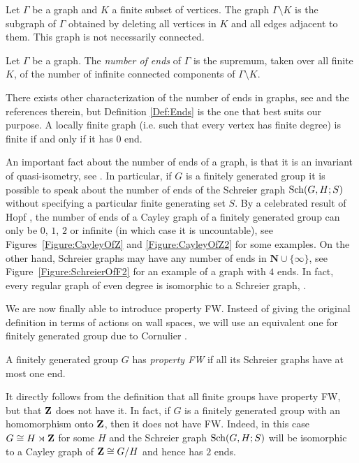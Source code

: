 Let $\Gamma$ be a graph and $K$ a finite subset of vertices. The graph $\Gamma\setminus K$ is the subgraph of $\Gamma$ obtained by deleting all vertices in $K$ and all edges adjacent to them. This graph is not necessarily connected.
\begin{defn}\label{Def:Ends}
Let $\Gamma$ be a graph. The \emph{number of ends} of $\Gamma$ is the supremum, taken over all finite $K$, of the number of infinite connected components of $\Gamma\setminus K$.
\end{defn}
There exists other characterization of the number of ends in graphs, %
see \cite{MR1967888} and the references therein, but Definition \ref{Def:Ends} is the one that best suits our purpose.
A locally finite graph (i.e. such that every vertex has finite degree) is finite if and only if it has $0$ end.

An important fact about the number of ends of a graph, is that it is an invariant of quasi-isometry, see \cite{MR1213151}. In particular, if $G$ is a finitely generated group it is possible to speak about the number of ends of the Schreier graph $\operatorname{Sch}(G,H;S)$ without specifying a particular finite generating set $S$.
By a celebrated result of Hopf \cite{MR10267}, the number of ends of a Cayley graph of a finitely generated group can only be $0$, $1$, $2$ or infinite (in which case it is uncountable), see Figures~\ref{Figure:CayleyOfZ} and \ref{Figure:CayleyOfZ2} for some examples.
On the other hand, Schreier graphs may have any number of ends in $\mathbf N\cup\{\infty\}$, see Figure~\ref{Figure:SchreierOfF2} for an example of a graph with $4$ ends.
In fact, every regular graph of even degree is isomorphic to a Schreier graph, \cite{MR0450121,MR1358635}.

We are now finally able to introduce property FW. Insteed of giving the original definition in terms of actions on wall spaces, we will use an equivalent one for finitely generated group due to Cornulier \cite{Cornulier2013}.
%
%
\begin{defn}
A finitely generated group $G$ has \emph{property FW} if all its Schreier graphs have at most one end.
\end{defn}
%
%
It directly follows from the definition that all finite groups have property FW, but that $\mathbf{Z}$ does not have it.
In fact, if $G$ is a finitely generated group with an homomorphism onto $\mathbf{Z}$, then it does not have FW. Indeed, in this case $G\cong H\rtimes \mathbf{Z}$  for some $H$ and the Schreier graph $\operatorname{Sch}(G,H;S)$ will be isomorphic to a Cayley graph of $\mathbf{Z}\cong G/H$ and hence has $2$ ends.

